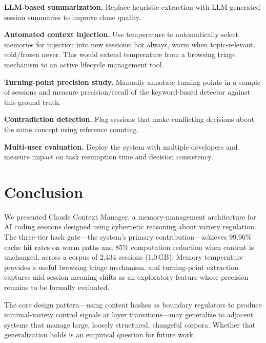 \documentclass[11pt]{article}
\begin{document}
\textbf{LLM-based summarization.} Replace heuristic extraction with LLM-generated session summaries to improve clone quality.

\textbf{Automated context injection.} Use temperature to automatically select memories for injection into new sessions: hot always, warm when topic-relevant, cold/frozen never. This would extend temperature from a browsing triage mechanism to an active lifecycle management tool.

\textbf{Turning-point precision study.} Manually annotate turning points in a sample of sessions and measure precision/recall of the keyword-based detector against this ground truth.

\textbf{Contradiction detection.} Flag sessions that make conflicting decisions about the same concept using reference counting.

\textbf{Multi-user evaluation.} Deploy the system with multiple developers and measure impact on task resumption time and decision consistency.

\section{Conclusion}

We presented Claude Context Manager, a memory-management architecture for AI coding sessions designed using cybernetic reasoning about variety regulation. The three-tier hash gate---the system's primary contribution---achieves 99.96\% cache hit rates on warm paths and 85\% computation reduction when content is unchanged, across a corpus of 2,434 sessions (1.0\,GB). Memory temperature provides a useful browsing triage mechanism, and turning-point extraction captures mid-session meaning shifts as an exploratory feature whose precision remains to be formally evaluated.

The core design pattern---using content hashes as boundary regulators to produce minimal-variety control signals at layer transitions---may generalize to adjacent systems that manage large, loosely structured, changeful corpora. Whether that generalization holds is an empirical question for future work.


\end{document}
